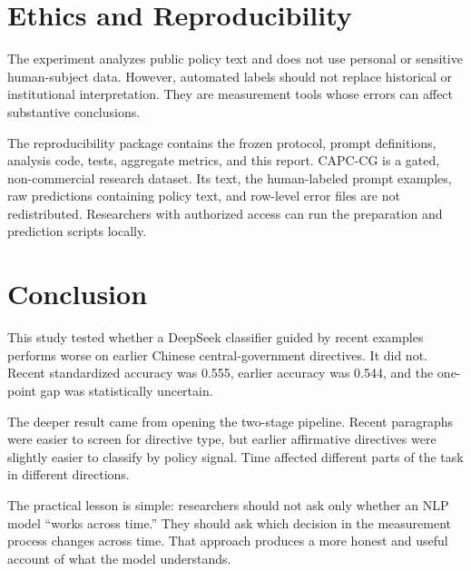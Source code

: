 \documentclass[11pt]{article}
\begin{document}
\section{Ethics and Reproducibility}

The experiment analyzes public policy text and does not use personal or sensitive human-subject data. However, automated labels should not replace historical or institutional interpretation. They are measurement tools whose errors can affect substantive conclusions.

The reproducibility package contains the frozen protocol, prompt definitions, analysis code, tests, aggregate metrics, and this report. CAPC-CG is a gated, non-commercial research dataset. Its text, the human-labeled prompt examples, raw predictions containing policy text, and row-level error files are not redistributed. Researchers with authorized access can run the preparation and prediction scripts locally.

\section{Conclusion}

This study tested whether a DeepSeek classifier guided by recent examples performs worse on earlier Chinese central-government directives. It did not. Recent standardized accuracy was 0.555, earlier accuracy was 0.544, and the one-point gap was statistically uncertain.

The deeper result came from opening the two-stage pipeline. Recent paragraphs were easier to screen for directive type, but earlier affirmative directives were slightly easier to classify by policy signal. Time affected different parts of the task in different directions.

The practical lesson is simple: researchers should not ask only whether an NLP model ``works across time.'' They should ask which decision in the measurement process changes across time. That approach produces a more honest and useful account of what the model understands.
\end{document}
